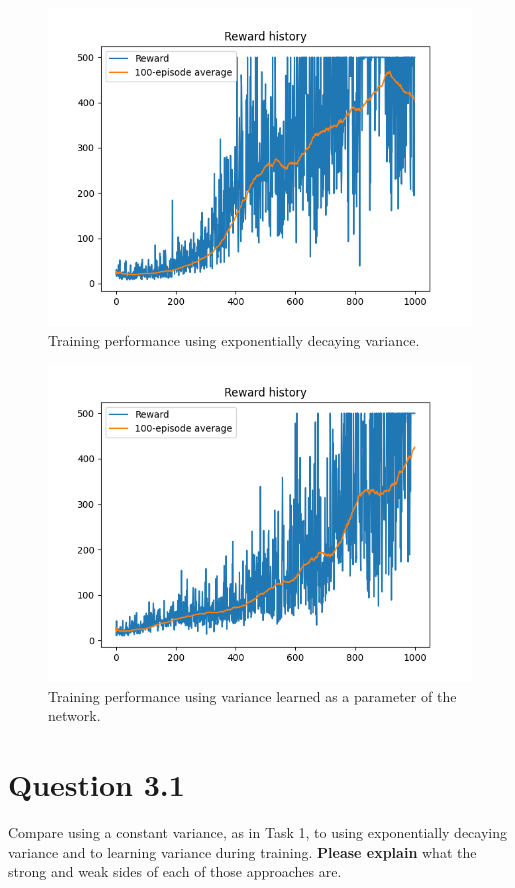 \documentclass[12pt]{article}
\begin{document}
\begin{figure}[phb] 
	\centering  %
    \includegraphics[width=0.8\columnwidth]{img/Figure_4_task_2a_cumulative_reward.png}
	\caption{Training performance using exponentially decaying variance.}
	\label{fig:fig4}
\end{figure}

\begin{figure}[pht] 
	\centering  %
    \includegraphics[width=0.8\columnwidth]{img/Figure_5_task_2b_cumulative_reward.png}
	\caption{Training performance using variance learned as a parameter of the network.}
	\label{fig:fig5}
\end{figure}

\pagebreak

\section*{Question 3.1}

Compare using a constant variance, as in Task 1, to using exponentially decaying variance and to learning variance during training. \textbf{Please explain} what the strong and weak sides of each of those approaches are.
\newline
\end{document}
